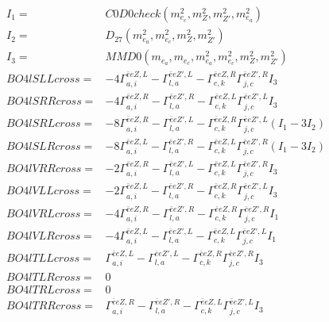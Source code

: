 \documentclass[A4,landscape]{article}
\begin{document}
\begin{align} 
I_1 = & C0D0check(m^2_{e_{{c}}}, m^2_{Z}, m^2_{{Z'}}, m^2_{e_{{a}}}) \\ 
I_2 = & D_{27}(m^2_{e_{{a}}}, m^2_{e_{{c}}}, m^2_{Z}, m^2_{{Z'}}) \\ 
I_3 = & MMD0(m_{e_{{a}}}, m_{e_{{c}}}, m^2_{e_{{a}}}, m^2_{e_{{c}}}, m^2_{Z}, m^2_{{Z'}}) \\ 
  BO4lSLLcross= & -4  \Gamma^{\bar{e}e Z ,L}_{a, i} - \Gamma^{\bar{e}e {Z'} ,L} _{l, a} - \Gamma^{\bar{e}e Z ,R} _{c, k} \Gamma^{\bar{e}e {Z'} ,R}_{j, c} I_3 \\ 
  BO4lSRRcross= & -4  \Gamma^{\bar{e}e Z ,R}_{a, i} - \Gamma^{\bar{e}e {Z'} ,R} _{l, a} - \Gamma^{\bar{e}e Z ,L} _{c, k} \Gamma^{\bar{e}e {Z'} ,L}_{j, c} I_3 \\ 
  BO4lSRLcross= & -8  \Gamma^{\bar{e}e Z ,R}_{a, i} - \Gamma^{\bar{e}e {Z'} ,L} _{l, a} - \Gamma^{\bar{e}e Z ,R} _{c, k} \Gamma^{\bar{e}e {Z'} ,L}_{j, c} (I_1 - 3 I_2) \\ 
  BO4lSLRcross= & -8  \Gamma^{\bar{e}e Z ,L}_{a, i} - \Gamma^{\bar{e}e {Z'} ,R} _{l, a} - \Gamma^{\bar{e}e Z ,L} _{c, k} \Gamma^{\bar{e}e {Z'} ,R}_{j, c} (I_1 - 3 I_2) \\ 
  BO4lVRRcross= & -2  \Gamma^{\bar{e}e Z ,R}_{a, i} - \Gamma^{\bar{e}e {Z'} ,L} _{l, a} - \Gamma^{\bar{e}e Z ,L} _{c, k} \Gamma^{\bar{e}e {Z'} ,R}_{j, c} I_3 \\ 
  BO4lVLLcross= & -2  \Gamma^{\bar{e}e Z ,L}_{a, i} - \Gamma^{\bar{e}e {Z'} ,R} _{l, a} - \Gamma^{\bar{e}e Z ,R} _{c, k} \Gamma^{\bar{e}e {Z'} ,L}_{j, c} I_3 \\ 
  BO4lVRLcross= & -4  \Gamma^{\bar{e}e Z ,R}_{a, i} - \Gamma^{\bar{e}e {Z'} ,R} _{l, a} - \Gamma^{\bar{e}e Z ,R} _{c, k} \Gamma^{\bar{e}e {Z'} ,R}_{j, c} I_1 \\ 
  BO4lVLRcross= & -4  \Gamma^{\bar{e}e Z ,L}_{a, i} - \Gamma^{\bar{e}e {Z'} ,L} _{l, a} - \Gamma^{\bar{e}e Z ,L} _{c, k} \Gamma^{\bar{e}e {Z'} ,L}_{j, c} I_1 \\ 
  BO4lTLLcross= &  \Gamma^{\bar{e}e Z ,L}_{a, i} - \Gamma^{\bar{e}e {Z'} ,L} _{l, a} - \Gamma^{\bar{e}e Z ,R} _{c, k} \Gamma^{\bar{e}e {Z'} ,R}_{j, c} I_3 \\ 
  BO4lTLRcross= & 0 \\ 
  BO4lTRLcross= & 0 \\ 
  BO4lTRRcross= &  \Gamma^{\bar{e}e Z ,R}_{a, i} - \Gamma^{\bar{e}e {Z'} ,R} _{l, a} - \Gamma^{\bar{e}e Z ,L} _{c, k} \Gamma^{\bar{e}e {Z'} ,L}_{j, c} I_3 \\ 
\end{align} 
\end{document}
